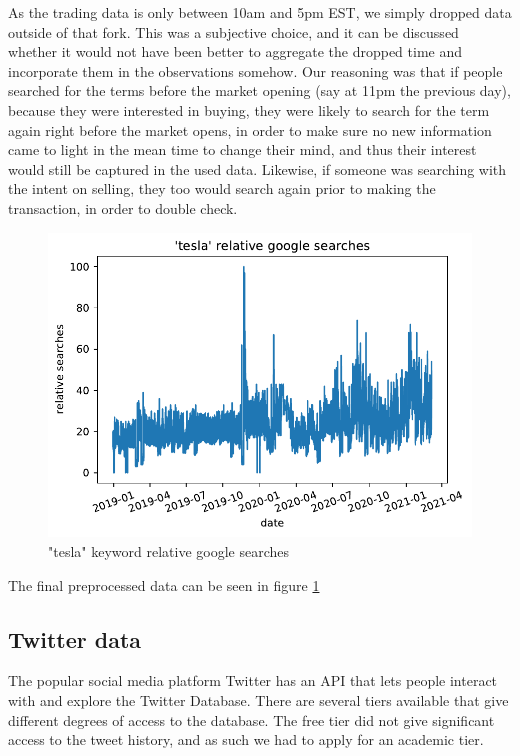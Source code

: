 As the trading data is only between 10am and 5pm EST, we simply dropped data outside of that fork. This was a subjective choice, and it can be discussed whether it would not have been better to aggregate the dropped time and incorporate them in the observations somehow. Our reasoning was that if people searched for the terms before the market opening (say at 11pm the previous day), because they were interested in buying, they were likely to search for the term again right before the market opens, in order to make sure no new information came to light in the mean time to change their mind, and thus their interest would still be captured in the used data. Likewise, if someone was searching with the intent on selling, they too would search again prior to making the transaction, in order to double check.

\begin{figure}[h]
	\centering
	\includegraphics[width=\textwidth]{img/img_GT_tesla.pdf}
	\caption{"tesla" keyword relative google searches}
	\label{fig:GT_tesla}
\end{figure}

The final preprocessed data can be seen in figure \ref{fig:GT_tesla}

\subsection{Twitter data}
The popular social media platform Twitter has an \Gls{API} that lets people interact with and explore the Twitter Database. There are several tiers available that give different degrees of access to the database. The free tier did not give significant access to the tweet history, and as such we had to apply for an academic tier.

